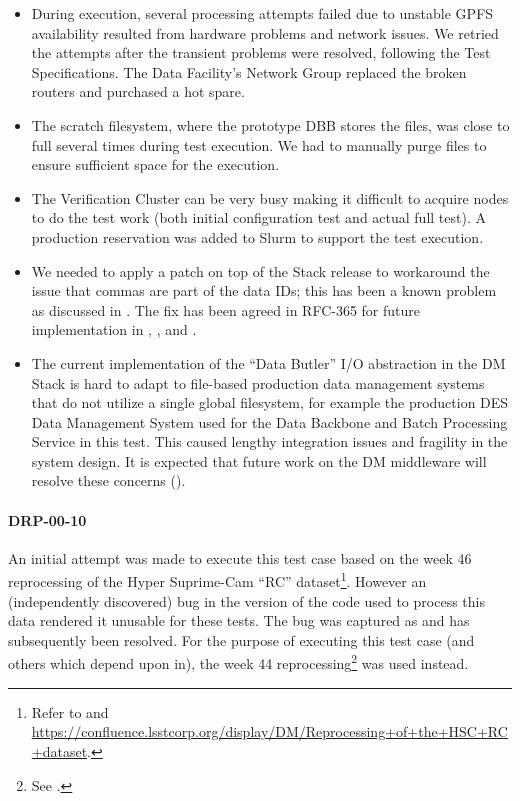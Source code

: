 \documentclass[DM,lsstdraft,STR,toc]{lsstdoc}
\begin{document}
\begin{itemize}

  \item{
    During execution, several processing attempts failed due to unstable GPFS availability resulted from hardware problems and network issues.
    We retried the attempts after the transient problems were resolved, following the Test Specifications.
    The Data Facility's Network Group replaced the broken routers and purchased a hot spare.
  }

  \item{
    The scratch filesystem, where the prototype DBB stores the files, was close to full several times during test execution.
	We had to manually purge files to ensure sufficient space for the execution.
  }

  \item{
    The Verification Cluster can be very busy making it difficult to acquire nodes to do the test work (both initial configuration test and actual full test).
        A production reservation was added to Slurm to support the test execution.
  }

  \item{
    We needed to apply a patch on top of the Stack release to workaround the issue that commas are part of the data IDs; this has been a known problem as discussed in .
	The fix has been agreed in RFC-365 for future implementation in , , and .
  }

  \item{
    The current implementation of the “Data Butler” I/O abstraction in the DM Stack is hard to adapt to file-based production data management systems that do not utilize a single global filesystem, for example the production DES Data Management System used for the Data Backbone and Batch Processing Service in this test.
    This caused lengthy integration issues and fragility in the system design.
    It is expected that future work on the DM middleware will resolve these concerns ().
  }
\end{itemize}

\paragraph{DRP-00-10}
\label{sect:problems-drp-00-10}

An initial attempt was made to execute this test case based on the week 46 reprocessing of the Hyper Suprime-Cam ``RC'' dataset\footnote{Refer to  and \url{https://confluence.lsstcorp.org/display/DM/Reprocessing+of+the+HSC+RC+dataset}.}.
However an (independently discovered) bug in the version of the code used to process this data rendered it unusable for these tests.
The bug was captured as  and has subsequently been resolved.
For the purpose of executing this test case (and others which depend upon in), the week 44 reprocessing\footnote{See .} was used instead.
\end{document}
